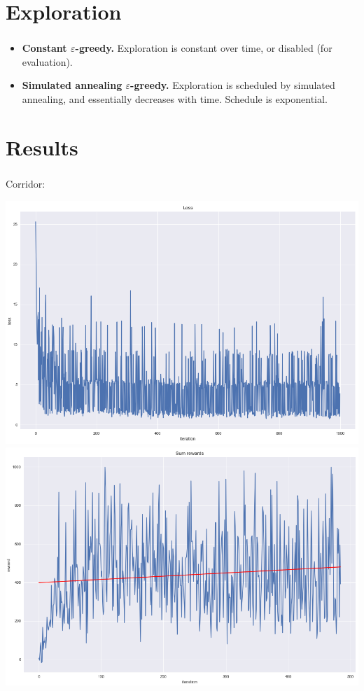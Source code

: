 \documentclass[t]{beamer}
\begin{document}
\section{Exploration}

\begin{frame}
	\frametitle{\insertsection}
		\begin{itemize}
		    \item {\bf Constant $\varepsilon$-greedy.} Exploration is constant over time, or disabled (for evaluation).
		    \item {\bf Simulated annealing $\varepsilon$-greedy.} Exploration is scheduled by simulated annealing, and essentially decreases with time. Schedule is exponential.
		\end{itemize}
\end{frame}

\section{Results}

\begin{frame}
	\frametitle{\insertsection}
	Corridor:

	\includegraphics[height=0.43\textheight]{images/corridor_loss.png}
	\includegraphics[height=0.43\textheight]{images/corridor_rewards.png}
\end{frame}
\end{document}
